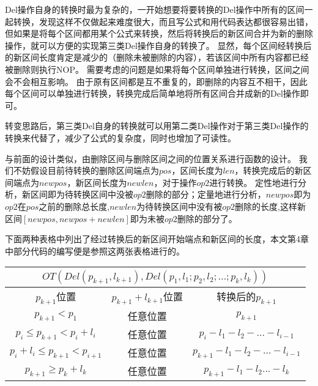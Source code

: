 Del操作自身的转换时最为复杂的，一开始想要将要转换的Del操作中所有的区间一起转换，发现这样不仅做起来难度很大，而且写公式和用代码表达都很容易出错，但如果是将每个区间都用某个公式来转换，然后将转换后的新区间合并为新的删除操作，就可以方便的实现第三类Del操作自身的转换了。
显然，每个区间经转换后的新区间长度肯定是减少的（删除未被删除的内容），若该区间中所有内容都已经被删除则执行NOP。
需要考虑的问题是如果将每个区间单独进行转换，区间之间会不会相互影响。
由于原有区间都是互不重复的，即删除的内容互不相干，因此每个区间可以单独进行转换，转换完成后简单地将所有区间合并成新的Del操作即可。

转变思路后，第三类Del自身的转换就可以用第二类Del操作对于第三类Del操作的转换来代替了，减少了公式的复杂度，同时也增加了可读性。

与前面的设计类似，由删除区间与删除区间之间的位置关系进行函数的设计。
我们不妨假设目前待转换的删除区间端点为$pos$，区间长度为$len$，转换完成后的新区间端点为$newpos$，新区间长度为$newlen$，对于操作$op2$进行转换。
定性地进行分析，新区间即为待转换区间中没被$op2$删除的部分；定量地进行分析，$newpos$即为$op2$在$pos$之前的删除总长度,$newlen$为待转换区间中没有被$op2$删除的长度,这样新区间$[newpos,newpos+newlen]$即为未被$op2$删除的部分了。

下面两种表格中列出了经过转换后的新区间开始端点和新区间的长度，本文第4章中部分代码的编写便是参照这两张表格进行的。

\begin{table}[H]
\centering
\begin{tabular}{|c|c|c|} 
\hline
\multicolumn{3}{|c|}{$OT(Del(p_{k+1},l_{k+1}),Del(p_1,l_1;p_2,l_2;...;p_k,l_k))$}\\ 
\hline
$p_{k+1}$位置 &$p_{k+1}+l_{k+1}$位置 &转换后的$p_{k+1}$\\
\hline
$p_{k+1} < p_1$  &任意位置  &$p_{k+1}$\\ 
\hline
$p_i \le p_{k+1} < p_i+l_i$ &任意位置  &$p_i-l_1-l_2-...-l_{i-1}$\\ 
\hline
$p_i+l_i \le p_{k+1} < p_{i+1}$  &任意位置  &$p_{k+1}-l_1-l_2-...-l_{i-1}$\\ 
\hline
$p_{k+1} \ge p_k+l_k$  &任意位置  &$p_{k+1}-l_1-l_2...-l_k$\\ 
\hline
\end{tabular}
\end{table}


